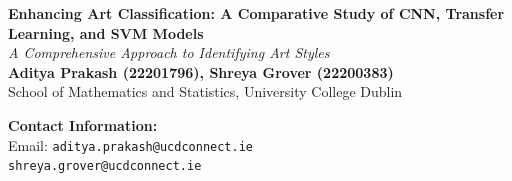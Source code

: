\documentclass[a0,portrait]{a0poster}
\begin{document}


\begin{minipage}[t]{0.60\linewidth}
\vspace{1cm} %
\Huge \color{ku} \textbf{Enhancing Art Classification: A Comparative Study of CNN, Transfer Learning, and SVM Models} \color{Black}\\[0.5cm]
\huge\textit{A Comprehensive Approach to Identifying Art Styles}\\[1cm]
\Large \textbf{Aditya Prakash (22201796), Shreya Grover (22200383)}\\[0.5cm]
\Large School of Mathematics and Statistics, University College Dublin

\end{minipage}
%
\begin{minipage}[t]{0.40\linewidth}
\vspace{1cm} %
\flushright
\color{DarkSlateGray}
\Large \textbf{Contact Information:}\\
Email: \texttt{aditya.prakash@ucdconnect.ie}\\%
\texttt{shreya.grover@ucdconnect.ie}
\end{minipage}

\vspace{1cm} %

\end{document}
